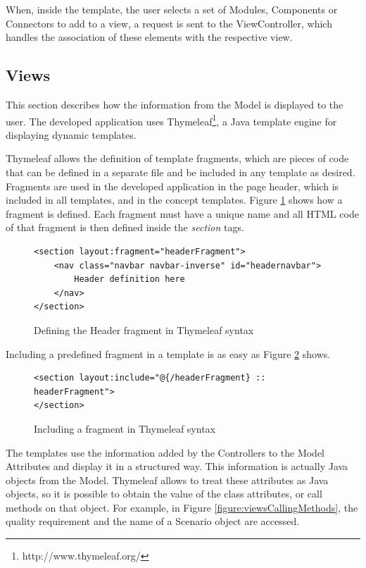 \documentclass[conference]{IEEEtran}
\begin{document}
When, inside the template, the user selects a set of Modules, Components or Connectors to add to a view, a request is sent to the ViewController, which handles the association of these elements with the respective view.

\subsection{Views}
\label{section:Views}
This section describes how the information from the Model is displayed to the user. The developed application uses Thymeleaf\footnote{http://www.thymeleaf.org/}, a Java template engine for displaying dynamic templates.

Thymeleaf allows the definition of template fragments, which are pieces of code that can be defined in a separate file and be included in any template as desired. Fragments are used in the developed application in the page header, which is included in all templates, and in the concept templates. Figure \ref{figure:viewsHeaderFragment} shows how a fragment is defined. Each fragment must have a unique name and all HTML code of that fragment is then defined inside the \textit{section} tags.
\begin{figure}
\lstset{style=customhtml}
\begin{lstlisting}
<section layout:fragment="headerFragment">
	<nav class="navbar navbar-inverse" id="headernavbar">
		Header definition here	
	</nav>
</section>
\end{lstlisting}
\caption{Defining the Header fragment in Thymeleaf syntax}
\label{figure:viewsHeaderFragment}
\end{figure}

Including a predefined fragment in a template is as easy as Figure \ref{figure:viewsIncludeFragment} shows.
\begin{figure}
\lstset{style=customhtml}
\begin{lstlisting}
<section layout:include="@{/headerFragment} :: headerFragment">
</section>
\end{lstlisting}
\caption{Including a fragment in Thymeleaf syntax}
\label{figure:viewsIncludeFragment}
\end{figure}

The templates use the information added by the Controllers to the Model Attributes and display it in a structured way. This information is actually Java objects from the Model. Thymeleaf allows to treat these attributes as Java objects, so it is possible to obtain the value of the class attributes, or call methods on that object. For example, in Figure \ref{figure:viewsCallingMethods}, the quality requirement and the name of a Scenario object are accessed.
\end{document}
